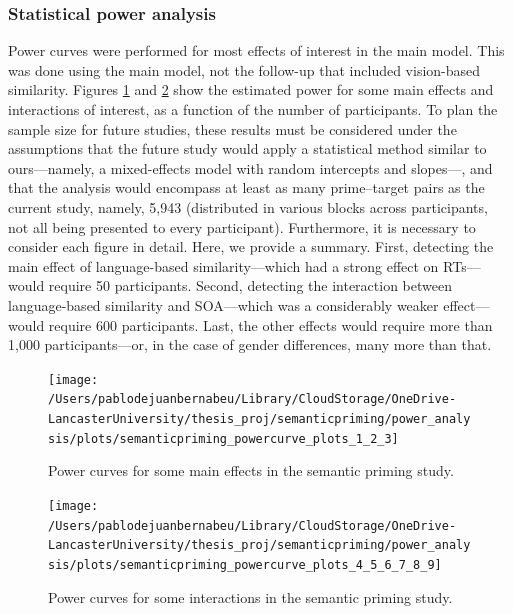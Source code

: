 \documentclass[
  12pt,
  man,floatsintext]{apa7}
\begin{document}
\hypertarget{statistical-power-analysis-2}{%
\subsubsection{Statistical power analysis}\label{statistical-power-analysis-2}}

Power curves were performed for most effects of interest in the main model. This was done using the main model, not the follow-up that included vision-based similarity. Figures \ref{fig:semanticpriming-powercurve-plots-1-2-3} and \ref{fig:semanticpriming-powercurve-plots-4-5-6-7-8-9} show the estimated power for some main effects and interactions of interest, as a function of the number of participants. To plan the sample size for future studies, these results must be considered under the assumptions that the future study would apply a statistical method similar to ours---namely, a mixed-effects model with random intercepts and slopes---, and that the analysis would encompass at least as many prime--target pairs as the current study, namely, 5,943 (distributed in various blocks across participants, not all being presented to every participant). Furthermore, it is necessary to consider each figure in detail. Here, we provide a summary. First, detecting the main effect of language-based similarity---which had a strong effect on RTs---would require 50 participants. Second, detecting the interaction between language-based similarity and SOA---which was a considerably weaker effect---would require 600 participants. Last, the other effects would require more than 1,000 participants---or, in the case of gender differences, many more than that.

\begin{figure}

{\centering \texttt{[image: /Users/pablodejuanbernabeu/Library/CloudStorage/OneDrive-LancasterUniversity/thesis\_proj/semanticpriming/power\_analysis/plots/semanticpriming\_powercurve\_plots\_1\_2\_3]} 

}

\caption{Power curves for some main effects in the semantic priming study.}\label{fig:semanticpriming-powercurve-plots-1-2-3}
\end{figure}

\begin{figure}

{\centering \texttt{[image: /Users/pablodejuanbernabeu/Library/CloudStorage/OneDrive-LancasterUniversity/thesis\_proj/semanticpriming/power\_analysis/plots/semanticpriming\_powercurve\_plots\_4\_5\_6\_7\_8\_9]} 

}

\caption{Power curves for some interactions in the semantic priming study.}\label{fig:semanticpriming-powercurve-plots-4-5-6-7-8-9}
\end{figure}
\end{document}
